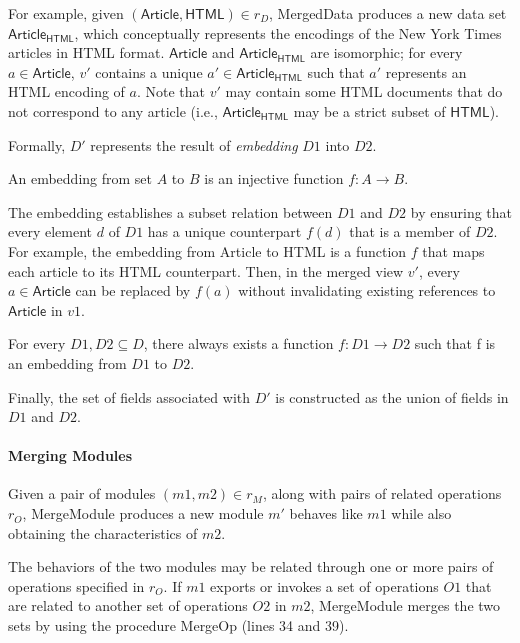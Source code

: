 For example, given $(\textsf{Article}, \textsf{HTML}) \in r_{D}$,
\textsf{MergedData} produces a new data set
$\textsf{Article}_{\textsf{HTML}}$, which conceptually represents the
encodings of the New York Times articles in HTML
format. $\textsf{Article}$ and $\textsf{Article}_{\textsf{HTML}}$ are
isomorphic; for every $a \in \textsf{Article}$, $v'$ contains a unique
$a' \in \textsf{Article}_{\textsf{HTML}}$ such that $a'$ represents an
HTML encoding of $a$. Note that $v'$ may contain some HTML documents
that do not correspond to any article (i.e.,
$\textsf{Article}_{\textsf{HTML}}$ may be a strict subset of $\textsf{HTML}$).

Formally, $D'$ represents the result of \textit{embedding} $D1$ into
$D2$.
\begin{defn} An embedding from set $A$ to $B$ is an injective function
  $f : A \rightarrow B$.
\end{defn}
The embedding establishes a subset relation between $D1$ and $D2$ by
ensuring that every element $d$ of $D1$ has a unique counterpart
$f(d)$ that is a member of $D2$. For example, the embedding from
\textsf{Article} to \textsf{HTML} is a function $f$ that maps each
article to its HTML counterpart. Then, in the merged view $v'$, every
$a \in \textsf{Article}$ can be replaced by $f(a)$ without
invalidating existing references to $\textsf{Article}$ in $v1$.

\begin{thm} For every $D1, D2 \subseteq D$, there always exists a
  function $f : D1 \rightarrow D2$ such that f is an embedding from
  $D1$ to $D2$.
\end{thm}

Finally, the set of fields associated with $D'$ is constructed as the
union of fields in $D1$ and $D2$. 

\paragraph{\textbf{Merging Modules}} Given a pair of modules $(m1, m2)
\in r_{M}$, along with pairs of related operations $r_{O}$,
\textsf{MergeModule} produces a new module $m'$ behaves like $m1$
while also obtaining the characteristics of $m2$.

The behaviors of the two modules may be related through one or more
pairs of operations specified in $r_{O}$. If $m1$ exports or invokes
a set of operations $O1$ that are related to another set of operations
$O2$ in $m2$, \textsf{MergeModule} merges the two sets by using the
procedure \textsf{MergeOp} (lines 34 and 39). 

